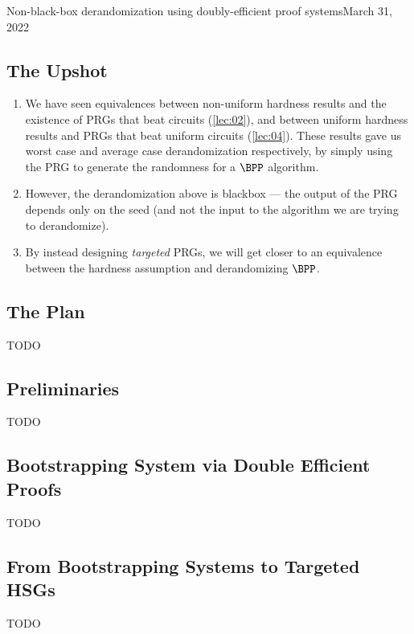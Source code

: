 
\begin{lecture}{10}{Non-black-box derandomization using doubly-efficient proof
  systems}{March 31, 2022}\label{lec:non-black-box}

\subsection*{The Upshot}

\begin{enumerate}
  \item We have seen equivalences between non-uniform hardness results and the
    existence of PRGs that beat circuits (\cref{lec:02}), and between uniform
    hardness results and PRGs that beat uniform circuits (\cref{lec:04}).
    These results gave us worst case and average case derandomization
    respectively, by simply using the PRG to generate the randomness for a
    $\BPP$ algorithm.
  \item However, the derandomization above is blackbox --- the output of the
    PRG depends only on the seed (and not the input to the algorithm we are
    trying to derandomize).
  \item By instead designing \emph{targeted} PRGs, we will get closer to an
    equivalence between the hardness assumption and derandomizing $\BPP$.
\end{enumerate}

\subsection{The Plan}
TODO

\subsection{Preliminaries}
TODO

\subsection{Bootstrapping System via Double Efficient Proofs}
TODO

\subsection{From Bootstrapping Systems to Targeted HSGs}
TODO

\end{lecture}
